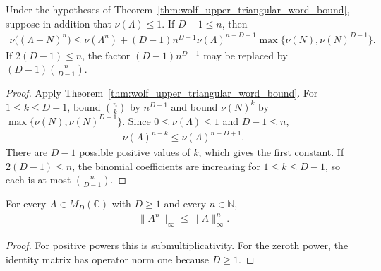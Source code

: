 \begin{theorem}
    \label{thm:wolf_upper_triangular_power_estimate}
    \leanok
    Under the hypotheses of Theorem~\ref{thm:wolf_upper_triangular_word_bound},
    suppose in addition that $\nu(\Lambda)\le 1$.  If $D-1\le n$, then
    \begin{align}
      \nu\bigl((\Lambda+N)^n\bigr)
      \le \nu(\Lambda^n)
      +(D-1)n^{D-1}\nu(\Lambda)^{n-D+1}
        \max\{\nu(N),\nu(N)^{D-1}\}.
    \end{align}
    If $2(D-1)\le n$, the factor $(D-1)n^{D-1}$ may be replaced by
    $(D-1)\binom{n}{D-1}$.
\end{theorem}

\begin{proof}
    \leanok
    Apply Theorem~\ref{thm:wolf_upper_triangular_word_bound}.  For
    $1\le k\le D-1$, bound $\binom{n}{k}$ by $n^{D-1}$ and bound
    $\nu(N)^k$ by $\max\{\nu(N),\nu(N)^{D-1}\}$.  Since
    $0\le\nu(\Lambda)\le1$ and $D-1\le n$,
    \begin{align}
      \nu(\Lambda)^{n-k}\le\nu(\Lambda)^{n-D+1}.
    \end{align}
    There are $D-1$ possible positive values of $k$, which gives the first
    constant.  If $2(D-1)\le n$, the binomial coefficients are increasing for
    $1\le k\le D-1$, so each is at most $\binom{n}{D-1}$.

\end{proof}

\begin{lemma}
    \label{lem:l2_operator_norm_matrix_power}
    \leanok
    For every $A\in M_D(\mathbb C)$ with $D\ge1$ and every $n\in\mathbb N$,
    \begin{align}
      \lVert A^n\rVert_\infty\le\lVert A\rVert_\infty^n.
    \end{align}
\end{lemma}

\begin{proof}
    \leanok
    For positive powers this is submultiplicativity.  For the zeroth power,
    the identity matrix has operator norm one because $D\ge1$.
\end{proof}

